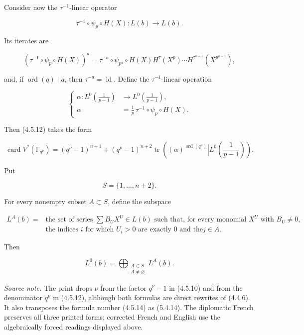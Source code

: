 Consider now the $\tau^{-1}$-linear operator

\begin{equation}\tag{4.5.13}
\tau^{-1}\circ\psi_p\circ H(X):L(b)\longrightarrow L(b).
\end{equation}

Its iterates are

\begin{equation}\tag{4.5.14}
(\tau^{-1}\circ\psi_p\circ H(X))^a
=\tau^{-a}\circ\psi_{p^a}\circ
H(X)H^\tau(X^p)\cdots H^{\tau^{a-1}}(X^{p^{a-1}}),
\end{equation}

and, if $\operatorname{ord}(q)\mid a$, then $\tau^{-a}=\operatorname{id}$.
Define the $\tau^{-1}$-linear operation

\begin{equation}\tag{4.5.15}
\left\{
\begin{aligned}
\alpha:L^0\!\left(\frac1{p-1}\right)
&\longrightarrow L^0\!\left(\frac1{p-1}\right),\\
\alpha&=\frac1p\,\tau^{-1}\circ\psi_p\circ H(X).
\end{aligned}
\right.
\end{equation}

Then (4.5.12) takes the form

\begin{equation}\tag{4.5.16}
\operatorname{card}V^*(\mathbb F_{q^\nu})
=(q^\nu-1)^{n+1}
+(q^\nu-1)^{n+2}
\operatorname{tr}\!\left(
\left.(\alpha)^{\operatorname{ord}(q^\nu)}
\right|L^0\!\left(\frac1{p-1}\right)\right).
\end{equation}

Put

\begin{equation}\tag{4.5.17}
S=\{1,\ldots,n+2\}.
\end{equation}

For every nonempty subset $A\subset S$, define the subspace

\begin{equation}\tag{4.5.18}
\begin{aligned}
L^A(b)={}&\text{the set of series $\sum B_UX^U\in L(b)$ such that, for every
monomial $X^U$ with $B_U\ne0$,}\\
&\text{the indices $i$ for which $U_i>0$ are exactly $0$ and the
$j\in A$}.
\end{aligned}
\end{equation}

Then

\begin{equation}\tag{4.5.19}
L^0(b)=\bigoplus_{\substack{A\subset S\\A\ne\varnothing}}L^A(b).
\end{equation}

\medskip
\noindent\emph{Source note.}
The print drops $\nu$ from the factor $q^\nu-1$ in (4.5.10) and from the
denominator $q^\nu$ in (4.5.12), although both formulas are direct rewrites
of (4.4.6). It also transposes the formula number (4.5.14) as (5.4.14).
The diplomatic French preserves all three printed forms; corrected French
and English use the algebraically forced readings displayed above.
